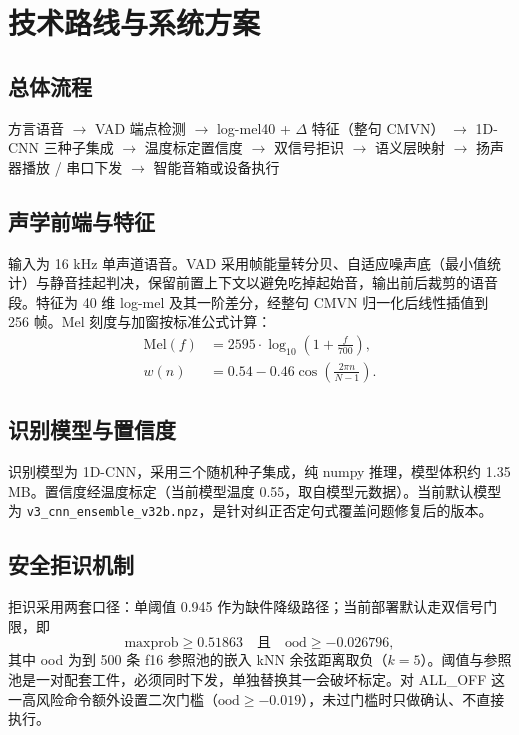 \documentclass[UTF8,a4paper,12pt,fontset=fandol]{ctexart}
\begin{document}
\section{技术路线与系统方案}

\subsection{总体流程}

\begin{center}
\small
方言语音 $\rightarrow$ VAD 端点检测 $\rightarrow$ log-mel40 + $\Delta$ 特征（整句 CMVN）
$\rightarrow$ 1D-CNN 三种子集成 $\rightarrow$ 温度标定置信度 $\rightarrow$ 双信号拒识
$\rightarrow$ 语义层映射 $\rightarrow$ 扬声器播放 / 串口下发 $\rightarrow$ 智能音箱或设备执行
\end{center}

\subsection{声学前端与特征}

输入为 16 kHz 单声道语音。VAD 采用帧能量转分贝、自适应噪声底（最小值统计）与静音挂起判决，保留前置上下文以避免吃掉起始音，输出前后裁剪的语音段。特征为 40 维 log-mel 及其一阶差分，经整句 CMVN 归一化后线性插值到 256 帧。Mel 刻度与加窗按标准公式计算：
\begin{align}
  \mathrm{Mel}(f) &= 2595 \cdot \log_{10}\!\left(1+\frac{f}{700}\right), \\
  w(n) &= 0.54 - 0.46\cos\!\left(\frac{2\pi n}{N-1}\right).
\end{align}

\subsection{识别模型与置信度}

识别模型为 1D-CNN，采用三个随机种子集成，纯 numpy 推理，模型体积约 1.35 MB。置信度经温度标定（当前模型温度 0.55，取自模型元数据）。当前默认模型为 \texttt{v3\_cnn\_ensemble\_v32b.npz}，是针对纠正否定句式覆盖问题修复后的版本。

\subsection{安全拒识机制}

拒识采用两套口径：单阈值 0.945 作为缺件降级路径；当前部署默认走双信号门限，即
\[
  \text{maxprob} \ge 0.51863 \quad \text{且} \quad \text{ood} \ge -0.026796,
\]
其中 ood 为到 500 条 f16 参照池的嵌入 kNN 余弦距离取负（$k=5$）。阈值与参照池是一对配套工件，必须同时下发，单独替换其一会破坏标定。对 ALL\_OFF 这一高风险命令额外设置二次门槛（$\text{ood} \ge -0.019$），未过门槛时只做确认、不直接执行。
\end{document}
